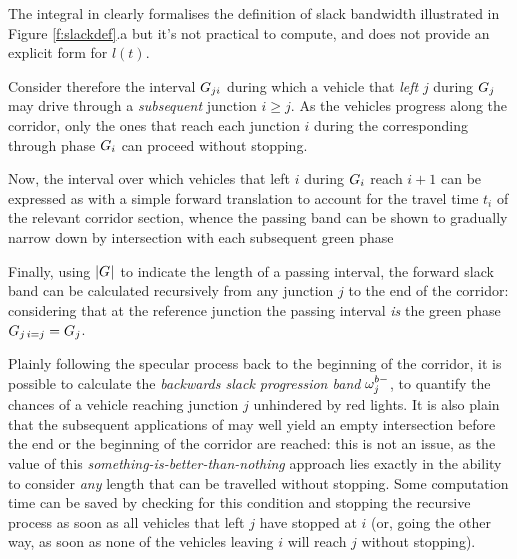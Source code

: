 The integral in  clearly formalises the definition of slack bandwidth illustrated in Figure \ref{f:slackdef}.a but it's not practical to compute, and does not provide an explicit form for $l(t)$.


Consider therefore the interval $G_{ji}$ during which a vehicle that \emph{left} $j$ during $G_{j}$ may drive through a \emph{subsequent} junction $i \geqslant j$. As the vehicles progress along the corridor, only the ones that reach each junction $i$ during the corresponding through phase $G_{i}$ can proceed without stopping.

Now, the interval over which vehicles that left $i$ during $G_{i}$ reach $i+1$ can be expressed as 
with a simple forward translation to account for the travel time $t_i$ of the relevant corridor section, whence the passing band can be shown to gradually narrow down by intersection with each subsequent green phase

Finally, using $|G_{}|$ to indicate the length of a passing interval, the forward slack band can be calculated recursively from any junction $j$ to the end of the corridor:
considering that at the reference junction the passing interval \emph{is} the green phase $G_{j\, i=j} = G_{j}$.

Plainly following the specular process back to the beginning of the corridor, it is possible to calculate the \emph{backwards slack progression band} $\omega_{j}^{\scriptstyle{b-}}$, to quantify the chances of a vehicle reaching junction $j$ unhindered by red lights. It is also plain that the subsequent applications of  may well yield an empty intersection before the end or the beginning of the corridor are reached: this is not an issue, as the value of this \emph{something-is-better-than-nothing} approach lies exactly in the ability to consider \emph{any} length that can be travelled without stopping. Some computation time can be saved by checking for this condition and stopping the recursive process  as soon as all vehicles that left $j$ have stopped at $i$ (or, going the other way, as soon as none of the vehicles leaving $i$ will reach $j$ without stopping).

